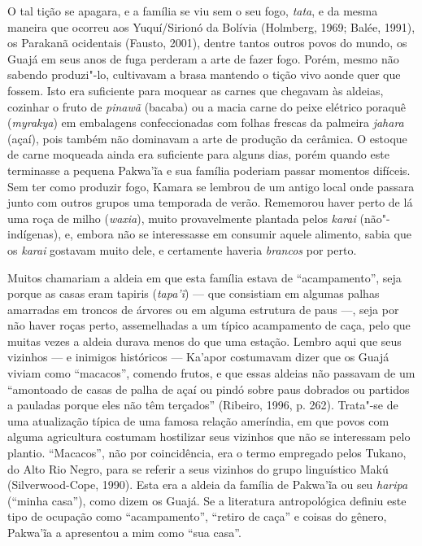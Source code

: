 O tal tição se apagara, e a família se viu sem o seu fogo,
\emph{tata}, e da mesma maneira que ocorreu aos Yuquí/Sirionó da Bolívia
(Holmberg, 1969; Balée, 1991), os Parakanã ocidentais (Fausto, 2001),
dentre tantos outros povos do mundo, os Guajá em seus anos de fuga
perderam a arte de fazer fogo. Porém, mesmo não sabendo produzi"-lo,
cultivavam a brasa mantendo o tição vivo aonde quer que fossem. Isto era
suficiente para moquear as carnes que chegavam às aldeias, cozinhar o
fruto de \emph{pinawã} (bacaba) ou a macia carne do peixe elétrico
poraquê (\emph{myrakya}) em embalagens confeccionadas com folhas frescas
da palmeira \emph{jahara} (açaí), pois também não dominavam a arte de
produção da cerâmica. O estoque de carne moqueada ainda era suficiente
para alguns dias, porém quando este terminasse a pequena Pakwa'ĩa e sua
família poderiam passar momentos difíceis. Sem ter como produzir fogo,
Kamara se lembrou de um antigo local onde passara junto com outros
grupos uma temporada de verão. Rememorou haver perto de lá uma roça de
milho (\emph{waxia}), muito provavelmente plantada pelos \emph{karai}
(não"-indígenas), e, embora não se interessasse em consumir aquele
alimento, sabia que os \emph{karai} gostavam muito dele, e certamente
haveria \emph{brancos} por perto.

Muitos chamariam a aldeia em que esta família estava de ``acampamento'',
seja porque as casas eram tapiris (\emph{tapa'ĩ}) --- que consistiam em
algumas palhas amarradas em troncos de árvores ou em alguma estrutura de
paus ---, seja por não haver roças perto, assemelhadas a um típico
acampamento de caça, pelo que muitas vezes a aldeia durava menos do que
uma estação. Lembro aqui que seus vizinhos --- e inimigos históricos ---
Ka'apor costumavam dizer que os Guajá viviam como ``macacos'', comendo
frutos, e que essas aldeias não passavam de um ``amontoado de casas de
palha de açaí ou pindó sobre paus dobrados ou partidos a pauladas porque
eles não têm terçados'' (Ribeiro, 1996, p. 262). Trata"-se de uma
atualização típica de uma famosa relação ameríndia, em que povos com
alguma agricultura costumam hostilizar seus vizinhos que não se
interessam pelo plantio. ``Macacos'', não por coincidência, era o termo
empregado pelos Tukano, do Alto Rio Negro, para se referir a seus
vizinhos do grupo linguístico Makú (Silverwood-Cope, 1990). Esta era a
aldeia da família de Pakwa'ĩa ou seu \emph{haripa} (``minha casa''),
como dizem os Guajá. Se a literatura antropológica definiu este tipo de
ocupação como ``acampamento'', ``retiro de caça'' e coisas do gênero,
Pakwa'ĩa a apresentou a mim como ``sua casa''.

